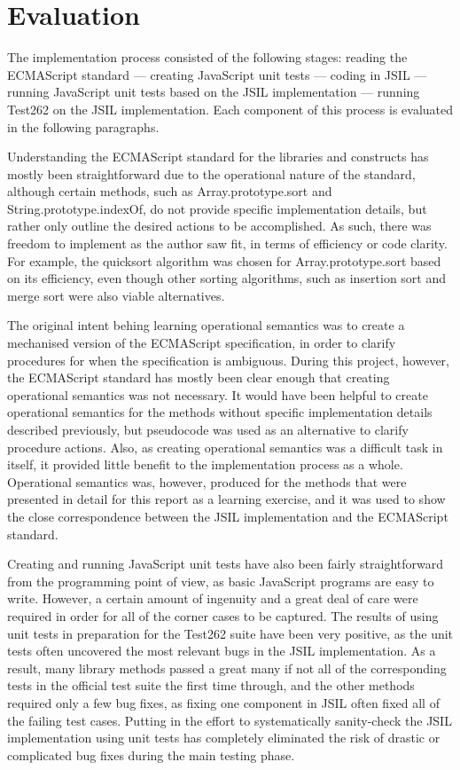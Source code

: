 \documentclass[a4paper,11pt,twoside]{report}
\begin{document}
\section{Evaluation}
The implementation process consisted of the following stages: reading the ECMAScript standard --- creating JavaScript unit tests --- coding in JSIL --- running JavaScript unit tests based on the JSIL implementation --- running Test262 on the JSIL implementation. Each component of this process is evaluated in the following paragraphs.

Understanding the ECMAScript standard for the libraries and constructs has mostly been straightforward due to the operational nature of the standard, although certain methods, such as Array.prototype.sort and String.prototype.indexOf, do not provide specific implementation details, but rather only outline the desired actions to be accomplished. As such, there was freedom to implement as the author saw fit, in terms of efficiency or code clarity. For example, the quicksort algorithm was chosen for Array.prototype.sort based on its efficiency, even though other sorting algorithms, such as insertion sort and merge sort were also viable alternatives.

The original intent behing learning operational semantics was to create a mechanised version of the ECMAScript specification, in order to clarify procedures for when the specification is ambiguous. During this project, however, the ECMAScript standard has mostly been clear enough that creating operational semantics was not necessary. It would have been helpful to create operational semantics for the methods without specific implementation details described previously, but pseudocode was used as an alternative to clarify procedure actions. Also, as creating operational semantics was a difficult task in itself, it provided little benefit to the implementation process as a whole. Operational semantics was, however, produced for the methods that were presented in detail for this report as a learning exercise, and it was used to show the close correspondence between the JSIL implementation and the ECMAScript standard.

Creating and running JavaScript unit tests have also been fairly straightforward from the programming point of view, as basic JavaScript programs are easy to write. However, a certain amount of ingenuity and a great deal of care were required in order for all of the corner cases to be captured. The results of using unit tests in preparation for the Test262 suite have been very positive, as the unit tests often uncovered the most relevant bugs in the JSIL implementation. As a result, many library methods passed a great many if not all of the corresponding tests in the official test suite the first time through, and the other methods required only a few bug fixes, as fixing one component in JSIL often fixed all of the failing test cases. Putting in the effort to systematically sanity-check the JSIL implementation using unit tests has completely eliminated the risk of drastic or complicated bug fixes during the main testing phase.
\end{document}
